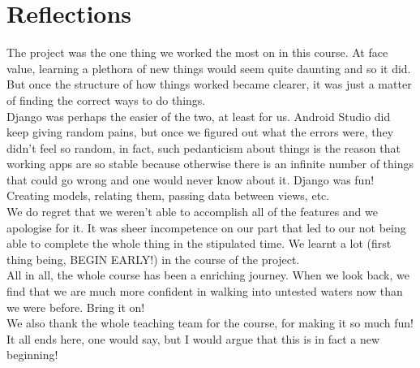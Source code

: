 \documentclass{article}
\begin{document}
\section{Reflections}
The project was the one thing we worked the most on in this course. At face value, learning a plethora of new things would seem quite daunting and so it did. But once the structure of how things worked became clearer, it was just a matter of finding the correct ways to do things.\\
\hfill \break	
Django was perhaps the easier of the two, at least for us. Android Studio did keep giving random pains, but once we figured out what the errors were, they didn't feel so random, in fact, such pedanticism about things is the reason that working apps are so stable because otherwise there is an infinite number of things that could go wrong and one would never know about it. Django was fun! Creating models, relating them, passing data between views, etc.\\ 
\hfill \break	
We do regret that we weren't able to accomplish all of the features and we apologise for it. It was sheer incompetence on our part that led to our not being able to complete the whole thing in the stipulated time. We learnt a lot (first thing being, BEGIN EARLY!) in the course of the project.\\
\hfill \break	
All in all, the whole course has been a enriching journey. When we look back, we find that we are much more confident in walking into untested waters now than we were before. Bring it on!\\
\hfill \break	
We also thank the whole teaching team for the course, for making it so much fun!\\
\hfill \break	
It all ends here, one would say, but I would argue that this is in fact a new beginning!
\end{document}
